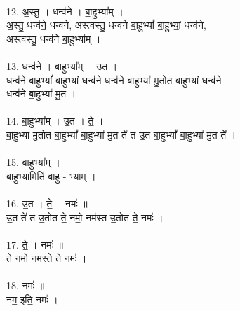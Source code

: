 \\
12. अ॒स्तु॒ । धन्व॑ने । बा॒हुभ्या᳚म् ।\\
अ॒स्तु॒ धन्व॑ने॒ धन्व॑ने, अस्त्वस्तु॒ धन्व॑ने बा॒हुभ्यां᳚ बा॒हुभ्यां॒ धन्व॑ने,\\
अस्त्वस्तु॒ धन्व॑ने बा॒हुभ्या᳚म् ।\\
\\
13. धन्व॑ने । बा॒हुभ्या᳚म् । उ॒त ।\\
धन्व॑ने बा॒हुभ्यां᳚ बा॒हुभ्यां॒ धन्व॑ने॒ धन्व॑ने बा॒हुभ्या॑ मु॒तोत बा॒हुभ्यां॒ धन्व॑ने॒\\
धन्व॑ने बा॒हुभ्या॑ मु॒त ।\\
\\
14. बा॒हुभ्या᳚म् । उ॒त । ते॒ ।\\
बा॒हुभ्या॑ मु॒तोत बा॒हुभ्यां᳚ बा॒हुभ्या॑ मु॒त ते॑ त उ॒त बा॒हुभ्यां᳚ बा॒हुभ्या॑ मु॒त ते᳚ ।\\
\\
15. बा॒हुभ्या᳚म् ।\\
बा॒हुभ्या॒मिति॑ बा॒हु - भ्या॒म् ।\\
\\
16. उ॒त । ते॒ । नमः॑ ॥\\
उ॒त ते॑ त उ॒तोत ते॒ नमो॒ नम॑स्त उ॒तोत ते॒ नमः॑ ।\\
\\
17. ते॒ । नमः॑ ॥\\
ते॒ नमो॒ नम॑स्ते ते॒ नमः॑ ।\\
\\
18. नमः॑ ॥\\
नम॒ इति॒ नमः॑ ।\\
\\
